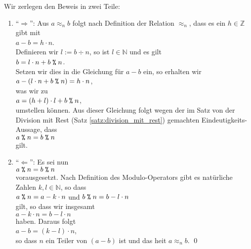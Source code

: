 \proof
Wir zerlegen den Beweis in zwei Teile:
\begin{enumerate}
\item ``$\Rightarrow$'':
      Aus $a \approx_n b$ folgt nach Definition der Relation $\approx_n$, dass es ein $h \in \mathbb{Z}$ gibt mit
      \\[0.2cm]
      \hspace*{1.3cm}
      $a - b = h \cdot n$.
      \\[0.2cm]
      Definieren wir $l := b \div n$, so ist $l \in \mathbb{N}$ und es gilt
      \\[0.2cm]
      \hspace*{1.3cm}
      $b = l \cdot n + b \;\texttt{\%}\; n$.
      \\[0.2cm]
      Setzen wir dies in die Gleichung f\"{u}r $a - b$ ein, so erhalten wir
      \\[0.2cm]
      \hspace*{1.3cm}
      $a - (l \cdot n + b \;\texttt{\%}\; n) = h \cdot n$,
      \\[0.2cm]
      was wir zu
      \\[0.2cm]
      \hspace*{1.3cm}
      $a = (h + l) \cdot l + b \;\texttt{\%}\; n$,
      \\[0.2cm]
      umstellen k\"{o}nnen.  Aus dieser Gleichung folgt wegen der im Satz von der Division mit Rest 
      (Satz \ref{satz:division_mit_rest})
      gemachten Eindeutigkeits-Aussage, dass
      \\[0.2cm]
      \hspace*{1.3cm}
      $a \;\texttt{\%}\; n = b \;\texttt{\%}\; n$
      \\[0.2cm]
      gilt. \checkmark
\item ``$\Leftarrow$'':
      Es sei nun 
      \\[0.2cm]
      \hspace*{1.3cm}
      $a \;\texttt{\%}\; n = b \;\texttt{\%}\; n$ 
      \\[0.2cm]
      vorausgesetzt. Nach Definition des Modulo-Operators gibt es nat\"{u}rliche Zahlen
      $k,l \in \mathbb{N}$, so dass 
      \\[0.2cm]
      \hspace*{1.3cm}
      $a \;\texttt{\%}\; n = a - k \cdot n$ \quad und \quad
      $b \;\texttt{\%}\; n = b - l \cdot n$ 
      \\[0.2cm]
      gilt, so dass wir insgesamt
      \\[0.2cm]
      \hspace*{1.3cm}
      $a - k \cdot n = b - l \cdot n$
      \\[0.2cm]
      haben.   Daraus folgt
      \\[0.2cm]
      \hspace*{1.3cm}
      $a - b = (k - l) \cdot n$,
      \\[0.2cm]
      so dass $n$ ein Teiler von $(a- b)$ ist und das hei\3t $a \approx_n b$. \checkmark \qed
\end{enumerate}

